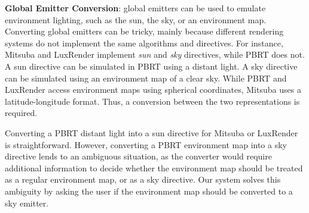 \textbf{Global Emitter Conversion}:
global emitters can be used to emulate environment lighting, such as the sun, the
sky, or an environment map. Converting global emitters can be tricky, mainly
because different rendering systems do not implement the same algorithms and directives. 
For instance, Mitsuba and LuxRender implement {\it sun} and {\it sky} directives, while PBRT does not.
A sun directive can be simulated in PBRT using a distant light. A sky directive can
be simulated using an environment map of a clear sky.
While PBRT and LuxRender access environment maps using spherical coordinates, 
Mitsuba uses a latitude-longitude format. Thus, a conversion between the two representations is required. 
  
%
Converting a PBRT distant light into
a sun directive for Mitsuba or LuxRender is straightforward. However, converting a PBRT
environment map into a sky directive lends to an ambiguous situation, as the converter would require additional information to decide 
whether the environment map should be treated as a regular environment map, or as a sky directive.
Our system solves this ambiguity by asking the user if the environment map should be converted to a sky
emitter.




